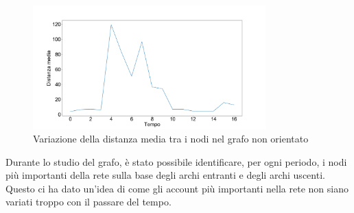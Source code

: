 \documentclass[12pt]{report}
\begin{document}
\begin{figure}[H]
    \centering\includegraphics[width=0.8\textwidth]{DistanzaMedia.png}
    \caption{Variazione della distanza media tra i nodi nel grafo non orientato}
\end{figure}


Durante lo studio del grafo, è stato possibile identificare, per ogni periodo, i nodi più importanti della rete sulla base degli archi entranti e degli archi uscenti.
Questo ci ha dato un'idea di come gli account più importanti nella rete non siano variati troppo con il passare del tempo.
\end{document}
